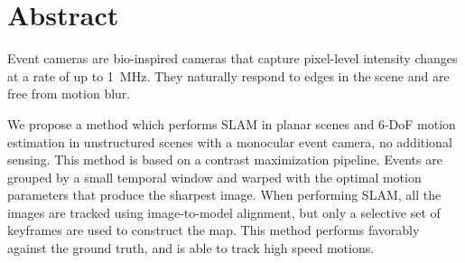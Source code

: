 \chapter*{Abstract}
 Event cameras are
bio-inspired cameras that capture pixel-level intensity changes at a
rate of up to \SI{1}{\mega\hertz}. They naturally respond to edges in
the scene and are free from motion blur.

We propose a method which performs SLAM in planar scenes and 6-DoF
motion estimation in unstructured scenes with a monocular event
camera, no additional sensing. This method is based on a contrast
maximization pipeline. Events are grouped by a small temporal window
and warped with the optimal motion parameters that produce the
sharpest image. When performing SLAM, all the images are tracked using
image-to-model alignment, but only a selective set of keyframes are
used to construct the map. This method performs favorably against the
ground truth, and is able to track high speed motions.
